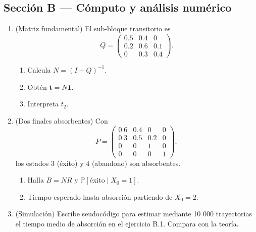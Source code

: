 \documentclass[11pt,spanish]{article}
\newcommand{\Prob}{\mathbb{P}}
\begin{document}
\subsection*{Sección B — Cómputo y análisis numérico}
\begin{enumerate}[label=\textbf{B.\arabic*}]
  \item (Matriz fundamental)  
        El sub-bloque transitorio es
        \[
          Q=\begin{pmatrix}
                0.5 & 0.4 & 0  \\
                0.2 & 0.6 & 0.1\\
                0   & 0.3 & 0.4
             \end{pmatrix}.
        \]
        \begin{enumerate}[label=\alph*)]
          \item Calcula \(N=(I-Q)^{-1}\).  
          \item Obtén \(\bm t=N\bm 1\).  
          \item Interpreta \(t_2\).
        \end{enumerate}

  \item (Dos finales absorbentes)  
        Con
        \[
          P=\begin{pmatrix}
                0.6 & 0.4 & 0   & 0\\
                0.3 & 0.5 & 0.2 & 0\\
                0   & 0   & 1   & 0\\
                0   & 0   & 0   & 1
             \end{pmatrix},
        \]
        los estados \(3\) (éxito) y \(4\) (abandono) son absorbentes.  
        \begin{enumerate}[label=\alph*)]
          \item Halla \(B=NR\) y \(\Prob[\text{éxito}\mid X_0=1]\).  
          \item Tiempo esperado hasta absorción partiendo de \(X_0=2\).
        \end{enumerate}

  \item (Simulación)  
        Escribe seudocódigo para estimar mediante 10 000 trayectorias el tiempo medio de absorción en el ejercicio B.1. Compara con la teoría.
\end{enumerate}
\end{document}
